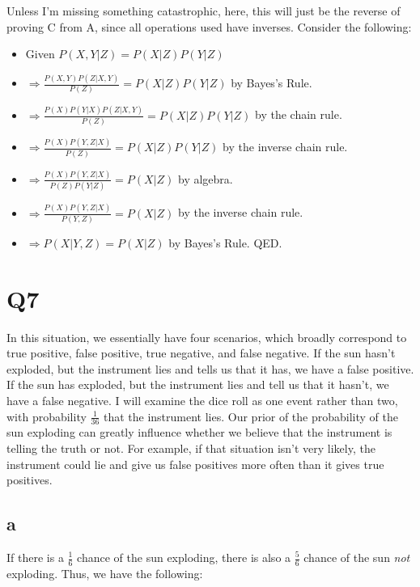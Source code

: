 \documentclass{article}
\begin{document}
Unless I'm missing something catastrophic, here, this will just be the reverse 
of proving C from A, since all operations used have inverses. 
Consider the following:

\begin{itemize}
    \item Given $P(X,Y|Z) = P(X|Z)P(Y|Z)$
    \item $\Rightarrow \frac{P(X,Y)P(Z|X,Y)}{P(Z)} = P(X|Z)P(Y|Z)$ by Bayes's Rule.
    \item $\Rightarrow \frac{P(X)P(Y|X)P(Z|X,Y)}{P(Z)} = P(X|Z)P(Y|Z)$ by the chain rule.
    \item $\Rightarrow \frac{P(X)P(Y,Z|X)}{P(Z)} = P(X|Z)P(Y|Z)$ by the inverse chain rule.
    \item $\Rightarrow \frac{P(X)P(Y,Z|X)}{P(Z)P(Y|Z)} = P(X|Z)$ by algebra.
    \item $\Rightarrow \frac{P(X)P(Y,Z|X)}{P(Y,Z)} = P(X|Z)$ by the inverse chain rule.
    \item $\Rightarrow P(X|Y,Z) = P(X|Z)$ by Bayes's Rule. QED.
\end{itemize}

\section{Q7}

In this situation, we essentially have four scenarios, which broadly correspond 
to true positive, false positive, true negative, and false negative. If the sun 
hasn't exploded, but the instrument lies and tells us that it has, we have a 
false positive. If the sun has exploded, but the instrument lies and tell us 
that it hasn't, we have a false negative. I will examine the dice roll as one 
event rather than two, with probability $\frac{1}{36}$ that the instrument 
lies. Our prior of the probability of the sun exploding can greatly influence 
whether we believe that the instrument is telling the truth or not. For 
example, if that situation isn't very likely, the instrument could lie and give 
us false positives more often than it gives true positives.

\subsection{a}

If there is a $\frac{1}{6}$ chance of the sun exploding, there is also a 
$\frac{5}{6}$ chance of the sun \textit{not} exploding. Thus, we have the 
following:
\end{document}
